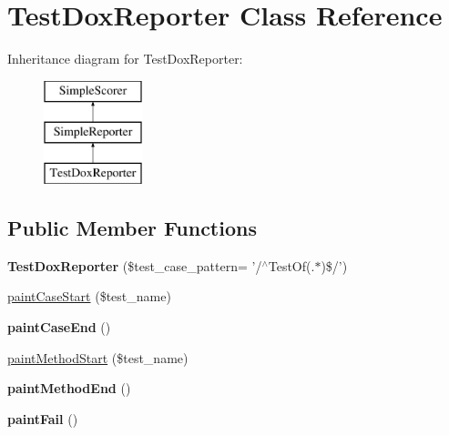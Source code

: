 \hypertarget{class_test_dox_reporter}{
\section{TestDoxReporter Class Reference}
\label{class_test_dox_reporter}
}
Inheritance diagram for TestDoxReporter:\begin{figure}[H]
\begin{center}
\leavevmode
\includegraphics[height=3.000000cm]{class_test_dox_reporter}
\end{center}
\end{figure}
\subsection*{Public Member Functions}
\begin{DoxyCompactItemize}
\item 
\hypertarget{class_test_dox_reporter_a83d8996609053a822932c304f8a35c25}{
{\bfseries TestDoxReporter} (\$test\_\-case\_\-pattern= '/$^\wedge$TestOf(.$\ast$)\$/')}
\label{class_test_dox_reporter_a83d8996609053a822932c304f8a35c25}

\item 
\hyperlink{class_test_dox_reporter_a0675ceed8813548f9d1bafc71c794f24}{paintCaseStart} (\$test\_\-name)
\item 
\hypertarget{class_test_dox_reporter_a4a52bba11f0032c739aac1487bc970fd}{
{\bfseries paintCaseEnd} ()}
\label{class_test_dox_reporter_a4a52bba11f0032c739aac1487bc970fd}

\item 
\hyperlink{class_test_dox_reporter_a1d7d83c7832d12c8626245ec38b80a96}{paintMethodStart} (\$test\_\-name)
\item 
\hypertarget{class_test_dox_reporter_ac23d9bff6582270e5d89fed8a1d8b5f5}{
{\bfseries paintMethodEnd} ()}
\label{class_test_dox_reporter_ac23d9bff6582270e5d89fed8a1d8b5f5}

\item 
\hypertarget{class_test_dox_reporter_a7c12c5f669b17f0d05bb4990c90fb5b5}{
{\bfseries paintFail} ()}
\label{class_test_dox_reporter_a7c12c5f669b17f0d05bb4990c90fb5b5}

\end{DoxyCompactItemize}
